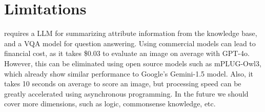 \section{Limitations}

\name requires a LLM for summarizing attribute information from the knowledge base, and a VQA model for question answering. Using commercial models can lead to financial cost, as it takes \$0.03 to evaluate an image on average with GPT-4o. However, this can be eliminated using open source models such as mPLUG-Owl3, which already show similar performance to Google's Gemini-1.5 model. Also, it takes 10 seconds on average to score an image, but processing speed can be greatly accelerated using asynchronous programming. In the future we should cover more dimensions, such as logic, commonsense knowledge, etc.

